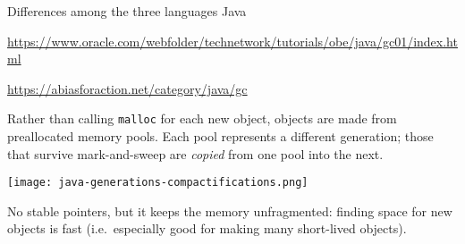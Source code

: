 \documentclass[aspectratio=169]{beamer}
\begin{document}
\begin{frame}{Differences among the three languages}
\vspace{0.1 cm}
\Huge
Java \hfill {\tiny \begin{minipage}{0.8\linewidth}\hfill \textcolor{blue}{\url{https://www.oracle.com/webfolder/technetwork/tutorials/obe/java/gc01/index.html}}

\hfill \textcolor{blue}{\url{https://abiasforaction.net/category/java/gc}}\end{minipage}}

\vspace{0.25 cm}
\normalsize
Rather than calling \texttt{malloc} for each new object, objects are made from preallocated memory pools. Each pool represents a different generation; those that survive mark-and-sweep are {\it copied} from one pool into the next.

\begin{center}
\texttt{[image: java-generations-compactifications.png]}
\end{center}

No stable pointers, but it keeps the memory unfragmented: finding space for new objects is fast (i.e.\ especially good for making many short-lived objects).
\end{frame}
\end{document}
